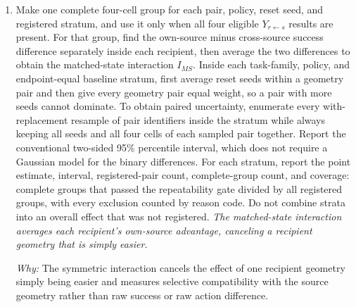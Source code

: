 \documentclass[10pt,a4paper]{article}
\begin{document}
\begin{enumerate}[leftmargin=*,start=4]
  \item Make one complete four-cell group for each pair, policy, reset seed, and registered stratum, and use it only when all four eligible \(Y_{r\leftarrow s}\) results are present. For that group, find the own-source minus cross-source success difference separately inside each recipient, then average the two differences to obtain the matched-state interaction \(I_{MS}.\) Inside each task-family, policy, and endpoint-equal baseline stratum, first average reset seeds within a geometry pair and then give every geometry pair equal weight, so a pair with more seeds cannot dominate. To obtain paired uncertainty, enumerate every with-replacement resample of pair identifiers inside the stratum while always keeping all seeds and all four cells of each sampled pair together. Report the conventional two-sided 95\% percentile interval, which does not require a Gaussian model for the binary differences. For each stratum, report the point estimate, interval, registered-pair count, complete-group count, and coverage: complete groups that passed the repeatability gate divided by all registered groups, with every exclusion counted by reason code. Do not combine strata into an overall effect that was not registered.
\noindent\emph{The matched-state interaction averages each recipient's own-source advantage, canceling a recipient geometry that is simply easier.}
\par{}
\par\emph{Why:} The symmetric interaction cancels the effect of one recipient geometry simply being easier and measures selective compatibility with the source geometry rather than raw success or raw action difference.
\end{enumerate}
\end{document}
